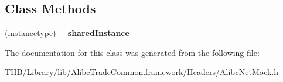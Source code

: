 \subsection*{Class Methods}
\begin{DoxyCompactItemize}
\item 
\mbox{\label{interface_alibc_net_mock_afcafa28b8d354830aa62a5dca911986f}} 
(instancetype) + {\bfseries shared\+Instance}
\end{DoxyCompactItemize}


The documentation for this class was generated from the following file\+:\begin{DoxyCompactItemize}
\item 
T\+H\+B/\+Library/lib/\+Alibc\+Trade\+Common.\+framework/\+Headers/Alibc\+Net\+Mock.\+h\end{DoxyCompactItemize}

